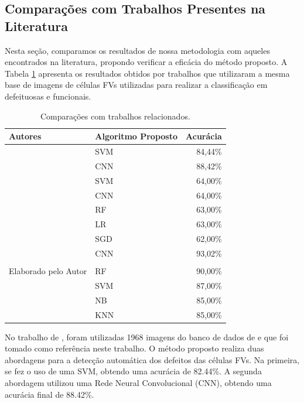 \documentclass[a4paper]{ifacconf}
\begin{document}
\subsection{Comparações com Trabalhos Presentes na Literatura}

Nesta seção, comparamos os resultados de nossa metodologia com aqueles encontrados na literatura, propondo verificar a eficácia do método proposto. 
A Tabela \ref{tab:07} apresenta os resultados obtidos por trabalhos que utilizaram a mesma base de imagens de células FVs utilizadas para realizar a classificação em defeituosas e funcionais.


\begin{table}[h]	
	\centering 
	\caption{Comparações com trabalhos relacionados.}\label{tab:07}	
		\begin{tabular}{llr}
			\cmidrule(r){1-3}
                \textbf{Autores} & \textbf{Algoritmo Proposto} & \textbf{Acurácia}\\ \midrule
                \midrule
                \citep{Deitsch2019} & SVM & 84,44\% \\
                & CNN & 88,42\% \\ 
                \hline
                \citep{Shin2020} & SVM & 64,00\% \\
                & CNN & 64,00\% \\
                & RF & 63,00\% \\
                & LR & 63,00\% \\
                & SGD & 62,00\% \\
                \hline
                \citep{Akram2019} & CNN & 93,02\% \\
                 &  &  \\
                \hline
                Elaborado pelo Autor & RF & 90,00\% \\
                & SVM & 87,00\% \\
                & NB & 85,00\% \\
                & KNN & 85,00\% \\
                \bottomrule
		\end{tabular}
\end{table}



No trabalho de \citep{Deitsch2019}, foram utilizadas 1968 imagens do banco de dados de \citep{Buerhop2018} e que foi tomado como referência neste trabalho. O método proposto realiza duas abordagens para a detecção automática dos defeitos das células FVs. Na primeira, se fez o uso de uma SVM, obtendo uma acurácia de 82.44\%. A segunda abordagem utilizou uma Rede Neural Convolucional (CNN), obtendo uma acurácia final de 88.42\%. 
\end{document}
